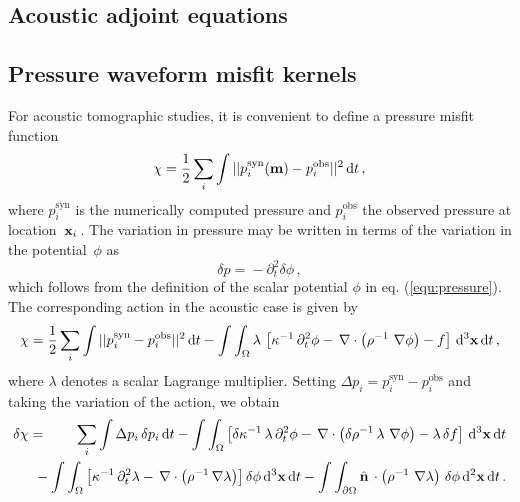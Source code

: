 \documentclass[referee,extra]{gji}
\newcommand{\bequ}{\begin{equation} }
\newcommand{\eequ}{\end{equation} }
\newcommand{\barr}{\begin{eqnarray} }
\newcommand{\earr}{\end{eqnarray} }
\newcommand{\bnabla}{ \, {\bf \nabla } }
\newcommand{\bm}{ {\bf m } }
\newcommand{\bx}{ {\bf x } }
\newcommand{\bnormal}{ \hat{ \bf{n} } \, }
\begin{document}
%
%
\begin{appendices}


\section{Acoustic adjoint equations}\label{appendix:acoustickernels}

\subsection{Pressure waveform misfit kernels}\label{appendix:acoustickernels1}

For acoustic tomographic studies, it is convenient to define a pressure misfit function
\bequ
\chi = \frac{1}{2} \sum_i \int || p_i^{\mathrm{syn}}(\bm) - p_i^{\mathrm{obs}} ||^2 \, \mathrm{d}t\, ,
\eequ
where $p_i^{\mathrm{syn}}$ is the numerically computed pressure and $p_i^{\mathrm{obs}}$ the observed pressure
at location~$\bx_i$\,.
The variation in pressure may be written in terms of the variation in the potential~$\phi$ as
\bequ
\delta p = \mbox{}- \partial_t^2 \delta \phi \,,
\eequ
which follows from the definition of the scalar potential $\phi$ in eq. (\ref{equ:pressure}).
The corresponding action in the acoustic case is given by
\bequ
\chi = \frac{1}{2} \sum_i \int || p_i^{\mathrm{syn}} - p_i^{\mathrm{obs}} ||^2 \, \mathrm{d}t
            - \int \int_{\Omega} \lambda\, \left[ \kappa^{-1}\, \partial_t^2 \phi - \bnabla \cdot \left( \rho^{-1} \,\bnabla \phi \right) - f  \right] \,\mathrm{d}^3\bx \, \mathrm{d}t\,,
\eequ
where $\lambda$ denotes a scalar Lagrange multiplier.
Setting $ \Delta p_i = p_i^{\mathrm{syn}}  - p_i^{\mathrm{obs}}$
and taking the variation of the action, we obtain
\barr \label{equ:acousticvariation}
\delta \chi & = & \sum_i \int \Delta p_i \, \delta p_i \, \mathrm{d}t
 - \int \int_{\Omega} \left[ \delta\kappa^{-1} \, \lambda \, \partial_t^2 \phi - \bnabla \cdot \left( \delta \rho^{-1} \, \lambda \,\bnabla \phi \right) - \lambda\, \delta f  \right] \, \mathrm{d}^3\bx \, \mathrm{d}t   \nonumber \\
& & \!\!\!\!\!\!\!\!\!\!\mbox{}- \int \int_{\Omega} \left[\kappa^{-1} \, \partial_t^2 \lambda - \bnabla \cdot \left( \rho^{-1} \bnabla \lambda \right) \right] \delta \phi \, \mathrm{d}^3\bx \, \mathrm{d}t
 - \int \int_{ \partial \Omega} \bnormal \cdot \left( \rho^{-1}\, \bnabla \lambda \right) \, \delta \phi \, \mathrm{d}^2\bx \, \mathrm{d}t \, .
\earr


\end{appendices}
\end{document}

